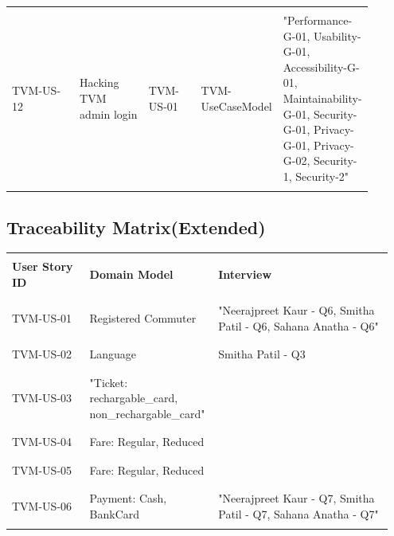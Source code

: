 \documentclass[a4paper,12pt]{report}
\begin{document}
\begin{longtable}{ | p{0.2\linewidth} | p{0.2\linewidth} | p{0.15\linewidth} | p{0.15\linewidth} | p{0.2\linewidth} | }
	
	& & & & \\
	TVM-US-12 & Hacking TVM admin login & TVM-US-01 & TVM-UseCaseModel & "Performance-G-01, Usability-G-01, Accessibility-G-01, Maintainability-G-01, Security-G-01, Privacy-G-01, Privacy-G-02, Security-1, Security-2" \\
	& & & & \\
	\hline
	
	
\end{longtable}

\vspace{1cm}
\subsection{Traceability Matrix(Extended)}
\begin{longtable}{ | p{0.2\linewidth} | p{0.3\linewidth} | p{0.45\linewidth} |}
	\hline

	& & \\
	\textbf{User Story ID} & \textbf{Domain Model} & \textbf{Interview} \\
	& & \\
	\hline
	
	& & \\
	TVM-US-01 & Registered Commuter & "Neerajpreet Kaur - Q6, Smitha Patil - Q6, Sahana Anatha - Q6" \\
	& & \\
	\hline
	
	& & \\
	TVM-US-02 & Language & Smitha Patil - Q3 \\
	& & \\ 
	\hline
	
	& & \\ 
	TVM-US-03 & "Ticket: \gls{rechargable_card}, \gls{non_rechargable_card}" & \\
	& & \\ 
	\hline
	
	& & \\ 
	TVM-US-04 & Fare: Regular, Reduced &  \\
	& & \\ 
	\hline
	
	& & \\ 
	TVM-US-05 & Fare: Regular, Reduced &  \\
	& & \\ 
	\hline
	
	
	& & \\ 
	TVM-US-06 & Payment: Cash, BankCard & "Neerajpreet Kaur - Q7, Smitha Patil - Q7, Sahana Anatha - Q7" \\
	& & \\ 
	\hline
	

\end{longtable}
\end{document}

